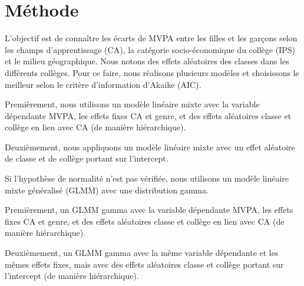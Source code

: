 \documentclass[french]{article}
\begin{document}
	\section{Méthode}
	
	L'objectif est de connaître les écarts de MVPA entre les filles et les garçons selon les champs d'apprentissage (CA), la catégorie socio-économique du collège (IPS) et le milieu géographique. Nous notons des effets aléatoires des classes dans les différents collèges. Pour ce faire, nous réalisons plusieurs modèles et choisissons le meilleur selon le critère d'information d'Akaike (AIC).
	
	Premièrement, nous utilisons un modèle linéaire mixte avec la variable dépendante MVPA, les effets fixes CA et genre, et des effets aléatoires classe et collège en lien avec CA (de manière hiérarchique). 
	
	Deuxièmement, nous appliquons un modèle linéaire mixte avec un effet aléatoire de classe et de collège portant sur l'intercept.
	
	Si l'hypothèse de normalité n'est pas vérifiée, nous utilisons un modèle linéaire mixte généralisé (GLMM) avec une distribution gamma. 
	
	Premièrement, un GLMM gamma avec la variable dépendante MVPA, les effets fixes CA et genre, et des effets aléatoires classe et collège en lien avec CA (de manière hiérarchique).
	
	Deuxièmement, un GLMM gamma avec la même variable dépendante et les mêmes effets fixes, mais avec des effets aléatoires classe et collège portant sur l'intercept (de manière hiérarchique).
	
\end{document}

